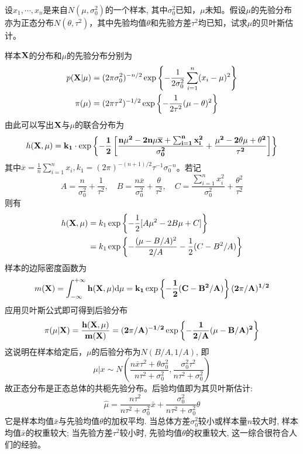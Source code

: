 \begin{example}
    设$x_1, \cdots, x_n$是来自$N(\mu, \sigma_0^2)$的一个样本, 其中$\sigma_0^2$已知，$\mu$未知。假设$\mu$的先验分布亦为正态分布$N(\theta, \tau^2)$，其中先验均值$\theta$和先验方差$\tau^2$均已知，试求$\mu$的贝叶斯估计。
\end{example}\begin{solution}
    样本$\bf X$的分布和$\mu$的先验分布分别为
    \begin{align*}
        p(\bf{X} | \mu) & = (2 \pi \sigma_0^2)^{-n/2} \exp \left\{-\frac1{2 \sigma_0^2} \sum_{i=1}^n (x_i-\mu)^2\right\} \\
        \pi(\mu)        & = (2 \pi \tau^2)^{-1/2} \exp \left\{-\frac1{2 \tau^2}(\mu-\theta)^2 \right\}
    \end{align*}
    由此可以写出$\bf X$与$\mu$的联合分布为
    \[ h(\bf{X}, \mu)=k_1 \cdot \exp \left\{-\frac12\left[\frac{n\mu^2 - 2n\mu \overline{x}+\sum_{i=1}^n  x_i^2}{\sigma_0^2}+\frac{\mu^2 - 2\theta \mu+\theta^2}{\tau^2}\right]\right\}\]
    其中$\overline{x}=\frac1n  \sum_{i=1}^n  x_i, k_1=(2 \pi)^{-(n+1)/2} \tau^{-1} \sigma_0^{-n}$。若记
    \[ A=\frac{n}{\sigma_0^2}+\frac1{\tau^2}, \quad B=\frac{n \overline{x}}{\sigma_0^2}+\frac{\theta}{\tau^2}, \quad C=\frac{\sum_{i=1}^n  x_i^2}{\sigma_0^2}+\frac{\theta^2}{\tau^2}\]
    则有
    \begin{align*}
        h(\bf{X}, \mu) & =k_1 \exp \left\{-\frac12[A \mu^2-2 B\mu+C] \right\}               \\
                       & =k_1 \exp \left\{-\frac{(\mu-B/A)^2}{2/A}-\frac12(C-B^2/A)\right\}
    \end{align*}
    样本的边际密度函数为
    \[ m(\bf{X})=\int_{-\infty}^{+\infty} h(\bf{X}, \mu) \mathrm{d}\mu=k_1 \exp \left\{-\frac12(C-B^2/A)\right\}(2 \pi/A)^{1/2} \]
    应用贝叶斯公式即可得到后验分布
    \[ \pi(\mu|\bf{X})=\frac{h(\bf{X}, \mu)}{m(\bf{X})}=(2 \pi/A)^{-1/2} \exp \left\{-\frac1{2/A}{(\mu-B/A)^2}\right\}\]
    这说明在样本给定后，$\mu$的后验分布为$N(B/A,1/A)$, 即
    \[ \mu | x \sim N\left(\frac{n \overline{x} \tau^2 +\theta\sigma_0^2}{n\tau^2 +\sigma_0^2}, \frac{\sigma_0^2\tau^2}{n \tau^2 +\sigma_0^2}\right)\]
    故正态分布是正态总体的共枙先验分布。后验均值即为其贝叶斯估计:
    \[ \hat{\mu}=\frac{n\tau^2}{n\tau^2 +\sigma_0^2} \bar{x}+\frac{\sigma_0^2}{n\tau^2 +\sigma_0^2} \theta\]
    它是样本均值$\bar x$与先验均值$\theta$的加权平均. 当总体方差$\sigma_0^2$较小或样本量$n$较大时, 样本均值$\bar x$的权重较大; 当先验方差$\tau^2$较小时, 先验均值$\theta$的权重较大, 这一综合很符合人们的经验。
\end{solution}

